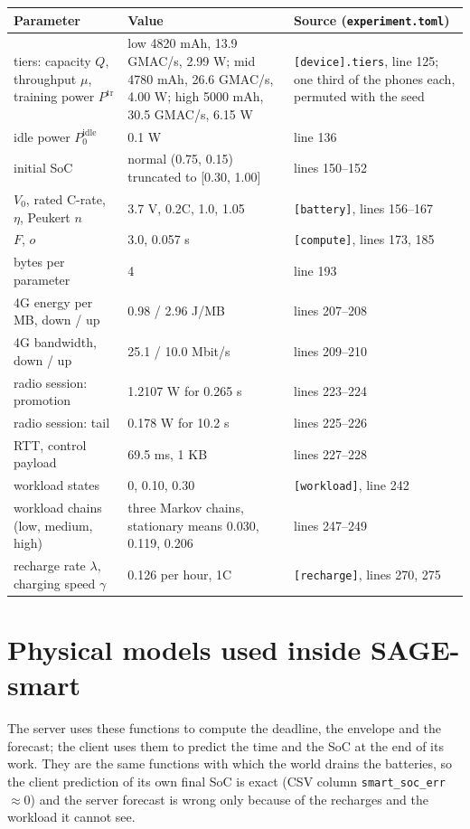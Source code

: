 \documentclass[11pt,a4paper]{article}
\newcommand{\cf}[1]{\texttt{#1}}
\begin{document}
\begin{longtable}{p{}p{}p{}}
\toprule
Parameter & Value & Source (\cf{experiment.toml}) \\
\midrule
\endhead
tiers: capacity $Q$, throughput $\mu$, training power $P^{\mathrm{tr}}$ & low 4820 mAh, 13.9 GMAC/s, 2.99 W; mid 4780 mAh, 26.6 GMAC/s, 4.00 W; high 5000 mAh, 30.5 GMAC/s, 6.15 W & \cf{[device].tiers}, line 125; one third of the phones each, permuted with the seed \\
idle power $P^{\mathrm{idle}}_0$ & 0.1 W & line 136 \\
initial SoC & normal (0.75, 0.15) truncated to [0.30, 1.00] & lines 150--152 \\
$V_0$, rated C-rate, $\eta$, Peukert $n$ & 3.7 V, 0.2C, 1.0, 1.05 & \cf{[battery]}, lines 156--167 \\
$F$, $o$ & 3.0, 0.057 s & \cf{[compute]}, lines 173, 185 \\
bytes per parameter & 4 & line 193 \\
4G energy per MB, down / up & 0.98 / 2.96 J/MB & lines 207--208 \\
4G bandwidth, down / up & 25.1 / 10.0 Mbit/s & lines 209--210 \\
radio session: promotion & 1.2107 W for 0.265 s & lines 223--224 \\
radio session: tail & 0.178 W for 10.2 s & lines 225--226 \\
RTT, control payload & 69.5 ms, 1 KB & lines 227--228 \\
workload states & 0, 0.10, 0.30 & \cf{[workload]}, line 242 \\
workload chains (low, medium, high) & three Markov chains, stationary means 0.030, 0.119, 0.206 & lines 247--249 \\
recharge rate $\lambda$, charging speed $\gamma$ & 0.126 per hour, 1C & \cf{[recharge]}, lines 270, 275 \\
\bottomrule
\end{longtable}

\newpage
\section{Physical models used inside SAGE-smart}
\label{sec:physics}

The server uses these functions to compute the deadline, the envelope and the
forecast; the client uses them to predict the time and the SoC at the end of
its work. They are the same functions with which the world drains the
batteries, so the client prediction of its own final SoC is exact (CSV column
\cf{smart\_soc\_err} $\approx 0$) and the server forecast is wrong only because
of the recharges and the workload it cannot see.
\end{document}
